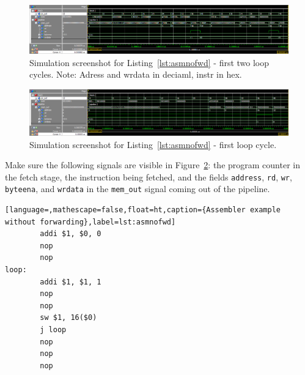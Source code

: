 
\begin{figure}[ht!]
  \centering
  \includegraphics[width=1.0\linewidth]{sim2.png}
  \caption{Simulation screenshot for Listing~\ref{lst:asmnofwd} - first two loop cycles. Note: Adress and wrdata in deciaml, instr in hex.}
  \label{fig:sim}
\end{figure}

\begin{figure}[ht!]
  \centering
  \includegraphics[width=1.0\linewidth]{sim3.png}
  \caption{Simulation screenshot for Listing~\ref{lst:asmnofwd} - first loop cycle.}
  \label{fig:sim}
\end{figure}

Make sure the following signals are visible in Figure~\ref{fig:sim}:
the program counter in the fetch stage, the instruction being fetched,
and the fields \texttt{address}, \texttt{rd}, \texttt{wr},
\texttt{byteena}, and \texttt{wrdata} in the \texttt{mem\_out} signal
coming out of the pipeline.

\begin{lstlisting}[language=,mathescape=false,float=ht,caption={Assembler example without forwarding},label=lst:asmnofwd]
        addi $1, $0, 0
        nop
        nop
loop:
        addi $1, $1, 1
        nop
        nop
        sw $1, 16($0)
        j loop
        nop
        nop
        nop
\end{lstlisting}



